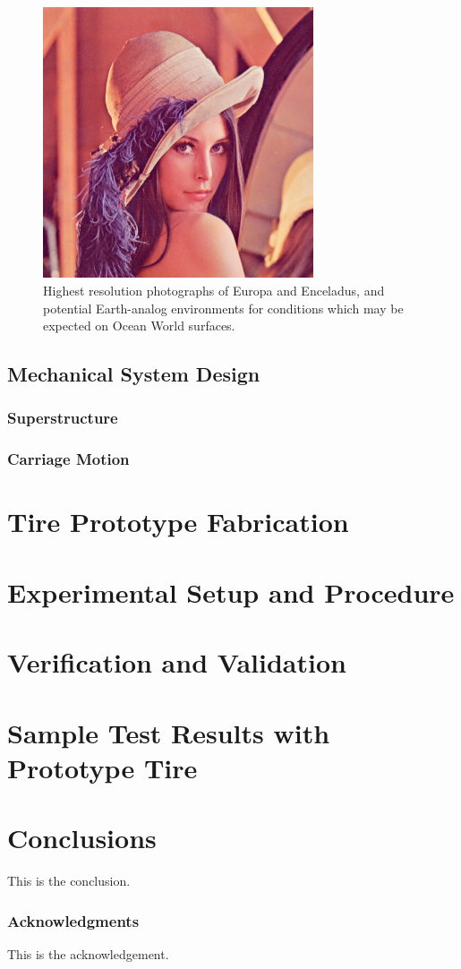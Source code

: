 \documentclass{article}
\begin{document}
\begin{figure}[hbt!]
\centering
\includegraphics[width=3.15in]{general-images/Lenna.png}
\caption{Highest resolution photographs of Europa and Enceladus, and potential Earth-analog environments for conditions which may be expected on Ocean World surfaces.}
\label{fig:icy-moon-photos-and-earth-analogs}
\end{figure}

\subsection{Mechanical System Design}


\subsubsection{Superstructure}


\subsubsection{Carriage Motion}
\label{subsubsec:carriage-motion}



\section{Tire Prototype Fabrication}
\label{sec:tire-prototyoe-fabrication}

\section{Experimental Setup and Procedure}


\section{Verification and Validation}


\section{Sample Test Results with Prototype Tire}

\section{Conclusions}

This is the conclusion.

\subsubsection*{Acknowledgments}
This is the acknowledgement.



\end{document}
